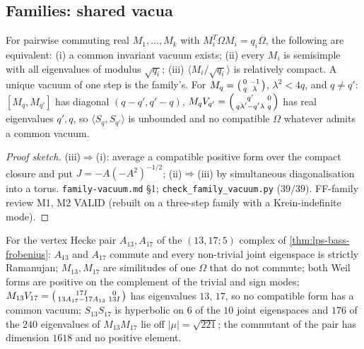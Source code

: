 \subsection{Families: shared vacua}

\begin{proposition}
\label{prop:gkp-commuting-shared-vacuum} 
For pairwise commuting real $M_1,\dots,M_k$ with $M_i^T\Omega M_i = q_i\Omega$, the following are equivalent: (i) a common invariant vacuum exists; (ii) every $M_i$ is semisimple %
with all eigenvalues of modulus $\sqrt{q_i}$; (iii) $\langle M_i/\sqrt{q_i}\rangle$ is relatively compact. A unique vacuum of one step is the family's. For $M_q =
\begin{psmallmatrix}0&-1\\q&\lambda\end{psmallmatrix}$, $\lambda^2<4q$, and $q\ne q'$: $[M_q,M_{q'}]$ has diagonal $(q-q',q'-q)$, $M_qV_{q'} =
\begin{psmallmatrix}q'&0\\q\lambda'-q'\lambda&q\end{psmallmatrix}$ has real eigenvalues $q',q$, so $\langle S_q,S_{q'}\rangle$ is unbounded and no compatible $\Omega$ %
whatever admits a common vacuum.
\end{proposition}
\begin{proof}[Proof sketch] (iii)$\Rightarrow$(i): average a compatible positive form over the compact closure and put $J = -A(-A^2)^{-1/2}$; (ii)$\Rightarrow$(iii) by
simultaneous diagonalisation into a torus. \texttt{family-vacuum.md} \S1; \texttt{check\_family\_vacuum.py} ($39/39$). FF-family review M1, M2 VALID (rebuilt on a three-step
family with a Krein-indefinite mode).
\end{proof}
\begin{numerical}
\label{num:gkp-lps-pair-vacua} 
For the vertex Hecke pair $A_{13},A_{17}$ of the $(13,17;5)$ complex of \cref{thm:lps-bass-frobenius}: $A_{13}$ and $A_{17}$ commute and every non-trivial joint eigenspace is
strictly Ramanujan; $M_{13},M_{17}$ are similitudes of one $\Omega$ that do not commute; both Weil forms are positive on the complement of the trivial and sign modes; %
$M_{13}V_{17} =
\begin{psmallmatrix}17I&0\\13A_{17}-17A_{13}&13I\end{psmallmatrix}$ has eigenvalues $13$, $17$, so no compatible form has a common vacuum; $S_{13}S_{17}$ is hyperbolic on $6$ of the
$10$ joint eigenspaces and $176$ of the $240$ eigenvalues of $M_{13}M_{17}$ lie off $|\mu| = \sqrt{221}$; the commutant of the pair has dimension $1618$ and no positive element. %

\end{numerical}
